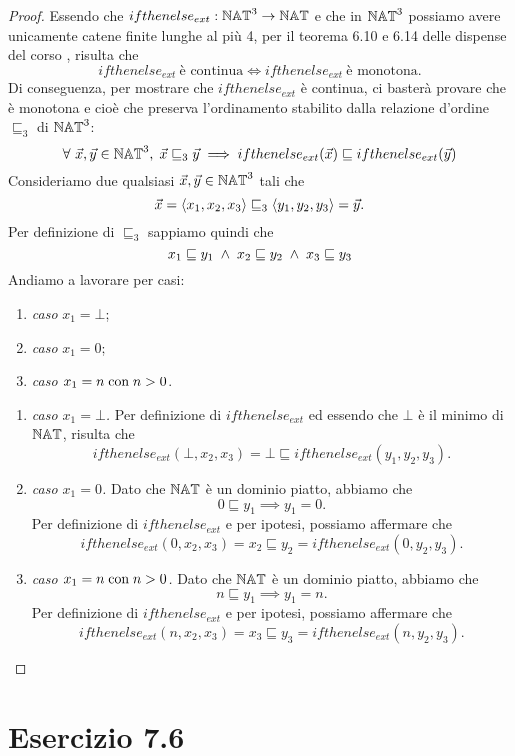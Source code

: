 \begin{proof}
Essendo che $ifthenelse_{ext}:\mathbb{NAT}^3 \rightarrow \mathbb{NAT}$ e che in $\mathbb{NAT}^3$ possiamo avere unicamente catene finite lunghe al più 4, per il teorema 6.10 e 6.14 delle dispense del corso \cite{mssc2016}, risulta che \[
	ifthenelse_{ext} \ \text{è continua} \iff ifthenelse_{ext} \ \text{è monotona}.
\]
Di conseguenza, per mostrare che $ifthenelse_{ext}$ è continua, ci basterà provare che è monotona e cioè che preserva l'ordinamento stabilito dalla relazione d'ordine $\sqsubseteq_3$ di $\mathbb{NAT}^3$: \[
	\forall \ \vec{x}, \vec{y} \in \mathbb{NAT}^3 ,\;
		\vec{x} \sqsubseteq_3 \vec{y} 
		\implies ifthenelse_{ext}(\vec{x}) \sqsubseteq ifthenelse_{ext}(\vec{y})
\]
Consideriamo due qualsiasi $\vec{x}, \vec{y} \in \mathbb{NAT}^3$ tali che \[
	\vec{x} = \langle x_1, x_2, x_3 \rangle \sqsubseteq_3 \langle y_1, y_2, y_3 \rangle = \vec{y}.
\]
Per definizione di $\sqsubseteq_3$ sappiamo quindi che \[
	x_1 \sqsubseteq y_1 \; \land \; x_2 \sqsubseteq y_2 \; \land \; x_3 \sqsubseteq y_3
\]
Andiamo a lavorare per casi:
\begin{enumerate}
\item \textit{caso} $x_1 = \bot$;
\item \textit{caso} $x_1 = 0$;
\item \textit{caso $x_1 = n \; \text{con} \; n>0$}.
\end{enumerate}
\begin{enumerate}[leftmargin=*]
\item \textit{caso $x_1 = \bot$.} Per definizione di $ifthenelse_{ext}$ ed essendo che $\bot$ è il minimo di $\mathbb{NAT}$, risulta che \[
	ifthenelse_{ext}(\bot, x_2, x_3) = \bot \sqsubseteq ifthenelse_{ext}(y_1, y_2, y_3).
\]
\item \textit{caso $x_1 = 0$.} Dato che $\mathbb{NAT}$ è un dominio piatto, abbiamo che \[
	0 \sqsubseteq y_1 \implies y_1 = 0.
\]
Per definizione di $ifthenelse_{ext}$ e per ipotesi, possiamo affermare che \[
	ifthenelse_{ext}(0, x_2, x_3) = x_2 \sqsubseteq  y_2 = ifthenelse_{ext}(0, y_2, y_3).
\]
\item \textit{caso $x_1 = n \; \text{con} \; n>0$.}  Dato che $\mathbb{NAT}$ è un dominio piatto, abbiamo che \[
	n \sqsubseteq y_1 \implies y_1 = n.
\]
Per definizione di $ifthenelse_{ext}$ e per ipotesi, possiamo affermare che \[
	ifthenelse_{ext}(n, x_2, x_3) = x_3 \sqsubseteq  y_3 = ifthenelse_{ext}(n, y_2, y_3).
\]
\end{enumerate}
\end{proof}

\section*{Esercizio 7.6}
{}
\label{es:7.6}


